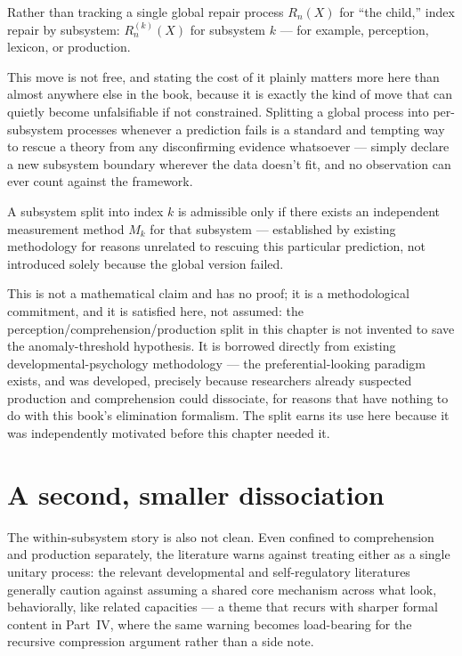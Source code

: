 \begin{repairbox}
\begin{definition}
Rather than tracking a single global repair process $R_n(X)$ for ``the child,'' index repair by subsystem: $R_n^{(k)}(X)$ for subsystem $k$ --- for example, perception, lexicon, or production.
\end{definition}

This move is not free, and stating the cost of it plainly matters more here than almost anywhere else in the book, because it is exactly the kind of move that can quietly become unfalsifiable if not constrained. Splitting a global process into per-subsystem processes whenever a prediction fails is a standard and tempting way to rescue a theory from any disconfirming evidence whatsoever --- simply declare a new subsystem boundary wherever the data doesn't fit, and no observation can ever count against the framework.

\begin{principle}
A subsystem split into index $k$ is admissible only if there exists an independent measurement method $M_k$ for that subsystem --- established by existing methodology for reasons unrelated to rescuing this particular prediction, not introduced solely because the global version failed.
\end{principle}

This is not a mathematical claim and has no proof; it is a methodological commitment, and it is satisfied here, not assumed: the perception/comprehension/production split in this chapter is not invented to save the anomaly-threshold hypothesis. It is borrowed directly from existing developmental-psychology methodology --- the preferential-looking paradigm exists, and was developed, precisely because researchers already suspected production and comprehension could dissociate, for reasons that have nothing to do with this book's elimination formalism. The split earns its use here because it was independently motivated before this chapter needed it.
\end{repairbox}

\section{A second, smaller dissociation}

The within-subsystem story is also not clean. Even confined to comprehension and production separately, the literature warns against treating either as a single unitary process: the relevant developmental and self-regulatory literatures generally caution against assuming a shared core mechanism across what look, behaviorally, like related capacities --- a theme that recurs with sharper formal content in Part~IV, where the same warning becomes load-bearing for the recursive compression argument rather than a side note.

